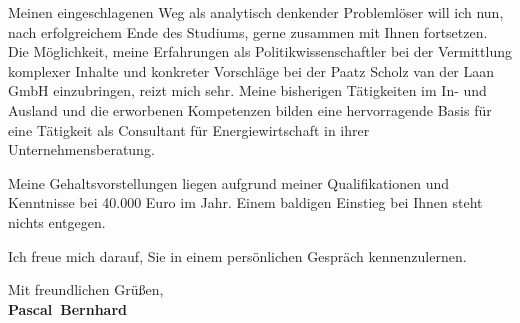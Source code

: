 \documentclass[11pt,a4paper]{article}
\def\firstname{Pascal}
\def\familyname{Bernhard}
\begin{document}
Meinen eingeschlagenen Weg als analytisch denkender Problemlöser will ich nun, nach erfolgreichem Ende des Studiums, gerne zusammen mit Ihnen fortsetzen.
Die Möglichkeit, meine Erfahrungen als Politikwissenschaftler bei der Vermittlung komplexer Inhalte und konkreter Vorschläge bei der Paatz Scholz van der Laan GmbH einzubringen, reizt mich sehr. Meine bisherigen Tätigkeiten im In- und Ausland und die erworbenen Kompetenzen bilden eine hervorragende Basis für eine Tätigkeit als Consultant für Energiewirtschaft in ihrer Unternehmensberatung.


Meine Gehaltsvorstellungen liegen aufgrund meiner Qualifikationen und Kenntnisse bei 40.000 Euro im Jahr. Einem baldigen Einstieg bei Ihnen steht nichts entgegen.


Ich freue mich darauf, Sie in einem persönlichen Gespräch kennenzulernen.

  
Mit freundlichen Grüßen,\\[3em] %
%
{\bfseries \firstname~\familyname}\\
%
\end{document}

